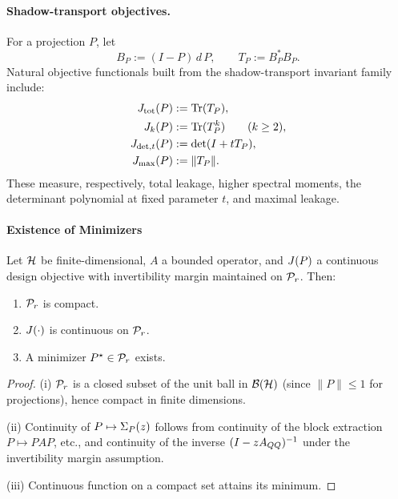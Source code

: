 \paragraph{Shadow-transport objectives.}
\label{ex:shadow-transport-objectives}
For a projection $P$, let
\[
B_P:=(I-P)\,d\,P,
\qquad
T_P:=B_P^*B_P.
\]
Natural objective functionals built from the shadow-transport invariant family
include:
\[
\begin{aligned}
J_{\mathrm{tot}}(P) &:= \mathrm{Tr}(T_P), \\
J_k(P) &:= \mathrm{Tr}(T_P^k) \qquad (k\ge 2), \\
J_{\det,t}(P) &:= \det(I+tT_P), \\
J_{\max}(P) &:= \|T_P\|.
\end{aligned}
\]
These measure, respectively, total leakage, higher spectral moments, the
determinant polynomial at fixed parameter $t$, and maximal leakage.

\paragraph{Existence of Minimizers}

\begin{theorem}
\label{thm:existence-minimizers}
Let $\mathcal{H}$ be finite-dimensional, $A$ a bounded operator, and $J(P)$ a continuous design objective with invertibility margin maintained on $\mathcal{P}_{r}$.
Then:
\begin{enumerate}[label=(\roman*)]
\item $\mathcal{P}_{r}$ is compact.
\item $J(\cdot)$ is continuous on $\mathcal{P}_{r}$.
\item A minimizer $P^\star \in \mathcal{P}_{r}$ exists.
\end{enumerate}
\end{theorem}

\begin{proof}
(i) $\mathcal{P}_{r}$ is a closed subset of the unit ball in $\mathcal{B}(\mathcal{H})$ (since $\|P\| \le 1$ for projections), hence compact in finite dimensions.

(ii) Continuity of $P \mapsto \Sigma_{P}(z)$ follows from continuity of the block extraction $P \mapsto PAP$, etc., and continuity of the inverse $(I - zA_{QQ})^{-1}$ under the invertibility margin assumption.

(iii) Continuous function on a compact set attains its minimum.
\end{proof}

